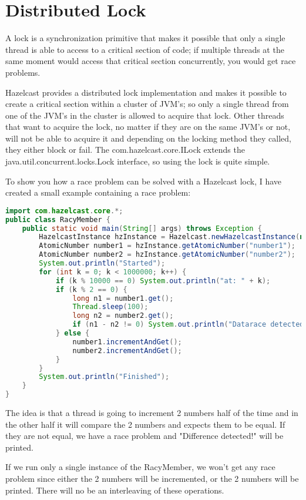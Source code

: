 \section{Distributed Lock}
A lock is a synchronization primitive that makes it possible that only a single thread is able to access to a critical section of code; if multiple threads at the same moment would access that critical section concurrently, you would get race problems. 

Hazelcast provides a distributed lock implementation and makes it possible to create a critical section within a cluster of JVM's; so only a single thread from one of the JVM's in the cluster is allowed to acquire that lock. Other threads that want to acquire the lock, no matter if they are on the same JVM's or not, will not be able to acquire it and depending on the locking method they called, they either block or fail. The com.hazelcast.core.ILock extends the java.util.concurrent.locks.Lock interface, so using the lock is quite simple.

To show you how a race problem can be solved with a Hazelcast lock, I have created a small example containing a race problem:
\begin{lstlisting}[language=java]
import com.hazelcast.core.*;
public class RacyMember {
    public static void main(String[] args) throws Exception {
        HazelcastInstance hzInstance = Hazelcast.newHazelcastInstance(null);
        AtomicNumber number1 = hzInstance.getAtomicNumber("number1");
        AtomicNumber number2 = hzInstance.getAtomicNumber("number2");
        System.out.println("Started");
        for (int k = 0; k < 1000000; k++) {
            if (k % 10000 == 0) System.out.println("at: " + k);
            if (k % 2 == 0) {
                long n1 = number1.get();
                Thread.sleep(100);
                long n2 = number2.get();
                if (n1 - n2 != 0) System.out.println("Datarace detected!");
            } else {
                number1.incrementAndGet();
                number2.incrementAndGet();
            }
        }
        System.out.println("Finished");
    }
}
\end{lstlisting}
The idea is that a thread is going to increment 2 numbers half of the time and in the other half it will compare the 2 numbers and expects them to be equal. If they are not equal, we have a race problem and "Difference detected!" will be printed.

If we run only a single instance of the RacyMember, we won't get any race problem since either the 2 numbers will be incremented, or the 2 numbers will be printed. There will no be an interleaving of these operations.

